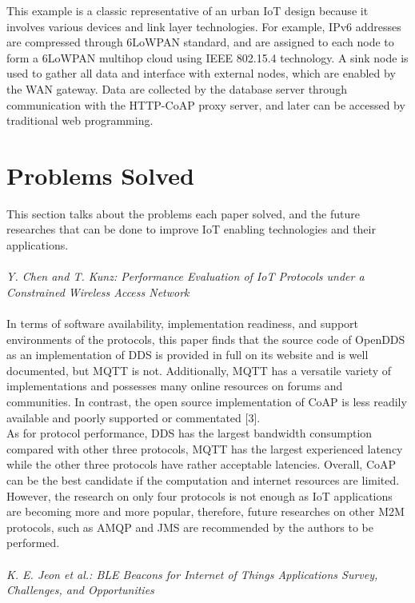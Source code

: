 \documentclass[conference]{IEEEtran}
\begin{document}
\text{\quad} This example is a classic representative of an urban IoT design because it involves various devices and link layer technologies. For example, IPv6 addresses are compressed through 6LoWPAN standard, and are assigned to each node to form a 6LoWPAN multihop cloud using IEEE 802.15.4 technology. A sink node is used to gather all data and interface with external nodes, which are enabled by the WAN gateway. Data are collected by the database server through communication with the HTTP-CoAP proxy server, and later can be accessed by traditional web programming.\\
\section{Problems Solved}
This section talks about the problems each paper solved, and the future researches that can be done to improve IoT enabling technologies and their applications.\\
\\
\textit{Y. Chen and T. Kunz: Performance Evaluation of IoT Protocols under a Constrained Wireless Access Network}
\\
\\
\text{\quad} In terms of software availability, implementation readiness, 
and support environments of the protocols, this paper finds that the source code of 
OpenDDS as an implementation of DDS is provided in full on 
its website and is well documented, but MQTT is not. 
Additionally, MQTT has a versatile variety of implementations 
and possesses many online resources on forums and 
communities. In contrast, the open source implementation of 
CoAP is less readily available and poorly supported or 
commentated [3]. \\
\text{\quad} As for protocol performance, DDS has the largest bandwidth consumption compared with other three protocols, MQTT has the largest experienced latency while the other three protocols have rather acceptable latencies. Overall, CoAP can be the best candidate if the computation and internet resources are limited. \\
\text{\quad} However, the research on only four protocols is not enough as IoT applications are becoming more and more popular, therefore, future researches on other M2M protocols, such as AMQP and JMS are recommended by the authors to be performed.
\\
\\
\textit{K. E. Jeon et al.: BLE Beacons for Internet of Things Applications Survey, Challenges, and Opportunities}
\end{document}
